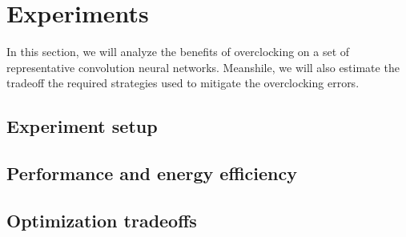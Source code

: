 \section{Experiments}
In this section, we will analyze the benefits of 
overclocking on a set of representative convolution neural networks.
Meanshile, we will also estimate the tradeoff the required strategies 
used to mitigate the overclocking errors.

\subsection{Experiment setup}

\subsection{Performance and energy efficiency}

\subsection{Optimization tradeoffs}


